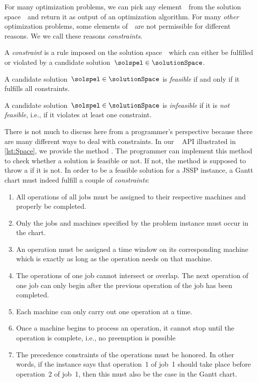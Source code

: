 %
%
\label{sec:solutionSpace:feasibility}%
%
For many optimization problems, we can pick any element~\solspel\ from the solution space~\solutionSpace\ and return it as output of an optimization algorithm.
For many \emph{other} optimization problems, some elements of~\solutionSpace\ are not permissible for different reasons.
We we call these reasons \emph{constraints}.%
%
%
%
\begin{definition}[Constraint]%
\label{def:constraint}%
A \emph{constraint} is a rule imposed on the solution space~\solutionSpace\ which can either be fulfilled or violated by a candidate solution~$\solspel\in\solutionSpace$.%
\end{definition}%
%
\begin{definition}[Feasibility]%
\label{def:feasibility}%
A candidate solution~$\solspel\in\solutionSpace$ is \emph{feasible} if and only if it fulfills all constraints.%
\end{definition}%
%
\begin{definition}[Infeasibility]%
\label{def:infeasibility}%
A candidate solution~$\solspel\in\solutionSpace$ is \emph{infeasible} if it is \emph{not feasible}, i.e., if it violates at least one constraint.%
\end{definition}%
%
\endhsection%
%
%
%
There is not much to discuss here from a programmer's perspective because there are many different ways to deal with constraints.
In our \moptipy\  API illustrated in \autoref{lst:Space}, we provide the method .
The programmer can implement this method to check whether a solution is feasible or not.
If not, the method is supposed to throw a  if it is not.%
%
\endhsection%
%
%
%
In order to be a feasible solution for a \gls{JSSP} instance, a Gantt chart must indeed fulfill a couple of \emph{constraints}:%
%
\begin{enumerate}
%
\item All operations of all jobs must be assigned to their respective machines and properly be completed.%
%
\item Only the jobs and machines specified by the problem instance must occur in the chart.%
%
\item An operation must be assigned a time window on its corresponding machine which is exactly as long as the operation needs on that machine.%
%
\item The operations of one job cannot intersect or overlap. %
The next operation of one job can only begin after the previous operation of the job has been completed.%
%
\item Each machine can only carry out one operation at a time.%
%
\item Once a machine begins to process an operation, it cannot stop until the operation is complete, i.e., no preemption is possible%
%
\item The precedence constraints of the operations must be honored. %
In other words, if the instance says that operation~1 of job~1 should take place before operation~2 of job~1, then this must also be the case in the Gantt chart.%
%
\end{enumerate}%
